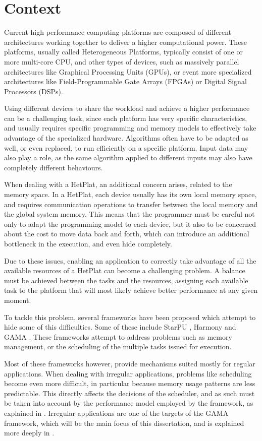\section{Context}

Current high performance computing platforms are composed of different architectures working together to deliver a higher computational power. These platforms, usually called Heterogeneous Platforms, typically consist of one or more multi-core CPU, and other types of devices, such as massively parallel architectures like Graphical Processing Units (GPUs), or event more specialized architectures like Field-Programmable Gate Arrays (FPGAs) or Digital Signal Processors (DSPs).

Using different devices to share the workload and achieve a higher performance can be a challenging task, since each platform has very specific characteristics, and usually requires specific programming and memory models to effectively take advantage of the specialized hardware. Algorithms often have to be adapted as well, or even replaced, to run efficiently on a specific platform. Input data may also play a role, as the same algorithm applied to different inputs may also have completely different behaviours.

When dealing with a HetPlat, an additional concern arises, related to the memory space. In a HetPlat, each device usually has its own local memory space, and requires communication operations to transfer between the local memory and the global system memory. This means that the programmer must be careful not only to adapt the programming model to each device, but it also to be concerned about the cost to move data back and forth, which can introduce an additional bottleneck in the execution, and even hide completely.

Due to these issues, enabling an application to correctly take advantage of all the available resources of a HetPlat can become a challenging problem. A balance must be achieved between the tasks and the resources, assigning each available task to the platform that will most likely achieve better performance at any given moment.

To tackle this problem, several frameworks have been proposed which  attempt to hide some of this difficulties. Some of these include StarPU \cite{augonnet2011starpu}, Harmony \cite{diamos2008harmony} and GAMA \cite{joao2012gama}. These frameworks attempt to address problems such as memory management, or the scheduling of the multiple tasks issued for execution.

Most of these frameworks however, provide mechanisms suited mostly for regular applications. When dealing with irregular applications, problems like scheduling become even more difficult, in particular because memory usage patterns are less predictable. This directly affects the decisions of the scheduler, and as such must be taken into account by the performance model employed by the framework, as explained in \cite{artur2012gama}. Irregular applications are one of the targets of the GAMA framework, which will be the main focus of this dissertation, and is explained more deeply in .



